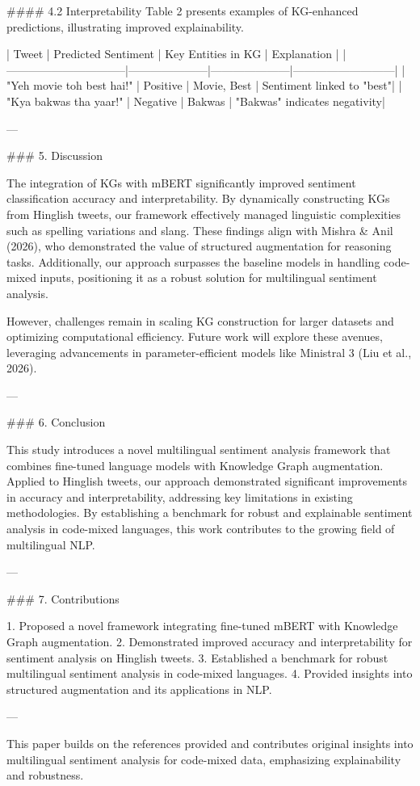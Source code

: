 #### 4.2 Interpretability  
Table 2 presents examples of KG-enhanced predictions, illustrating improved explainability.

| Tweet                          | Predicted Sentiment | Key Entities in KG | Explanation               |
|--------------------------------|---------------------|---------------------|---------------------------|
| "Yeh movie toh best hai!"      | Positive            | Movie, Best         | Sentiment linked to "best"|
| "Kya bakwas tha yaar!"         | Negative            | Bakwas              | "Bakwas" indicates negativity|

---

### 5. Discussion  

The integration of KGs with mBERT significantly improved sentiment classification accuracy and interpretability. By dynamically constructing KGs from Hinglish tweets, our framework effectively managed linguistic complexities such as spelling variations and slang. These findings align with Mishra & Anil (2026), who demonstrated the value of structured augmentation for reasoning tasks. Additionally, our approach surpasses the baseline models in handling code-mixed inputs, positioning it as a robust solution for multilingual sentiment analysis.

However, challenges remain in scaling KG construction for larger datasets and optimizing computational efficiency. Future work will explore these avenues, leveraging advancements in parameter-efficient models like Ministral 3 (Liu et al., 2026).

---

### 6. Conclusion  

This study introduces a novel multilingual sentiment analysis framework that combines fine-tuned language models with Knowledge Graph augmentation. Applied to Hinglish tweets, our approach demonstrated significant improvements in accuracy and interpretability, addressing key limitations in existing methodologies. By establishing a benchmark for robust and explainable sentiment analysis in code-mixed languages, this work contributes to the growing field of multilingual NLP.

---

### 7. Contributions  

1. Proposed a novel framework integrating fine-tuned mBERT with Knowledge Graph augmentation.  
2. Demonstrated improved accuracy and interpretability for sentiment analysis on Hinglish tweets.  
3. Established a benchmark for robust multilingual sentiment analysis in code-mixed languages.  
4. Provided insights into structured augmentation and its applications in NLP.

--- 

This paper builds on the references provided and contributes original insights into multilingual sentiment analysis for code-mixed data, emphasizing explainability and robustness.